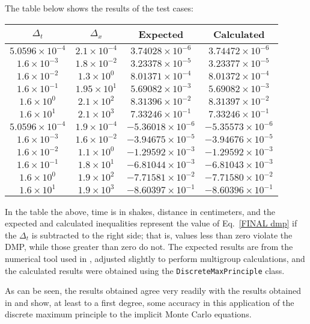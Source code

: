 \newpage
The table below shows the results of the test cases:
\begin{center}
\begin{tabular}{c c c c}
$\Delta_t$ & $\Delta_x$ & Expected & Calculated \\ \hline
$5.0596\times10^{-4}$ & $2.1\times10^{-4}$ & $3.74028\times10^{-6}$ &
  $3.74472\times10^{-6}$ \\
$1.6\times10^{-3}$ & $1.8\times10^{-2}$ & $3.23378\times10^{-5}$ &
  $3.23377\times10^{-5}$ \\
$1.6\times10^{-2}$ & $1.3\times10^{0}$ & $8.01371\times10^{-4}$ &
  $8.01372\times10^{-4}$ \\
$1.6\times10^{-1}$ & $1.95\times10^{1}$ & $5.69082\times10^{-3}$ &
  $5.69082\times10^{-3}$ \\
$1.6\times10^{0}$ & $2.1\times10^{2}$ & $8.31396\times10^{-2}$ &
  $8.31397\times10^{-2}$ \\
$1.6\times10^{1}$ & $2.1\times10^{3}$ & $7.33246\times10^{-1}$ &
  $7.33246\times10^{-1}$ \\ \hline
$5.0596\times10^{-4}$ & $1.9\times10^{-4}$ & $-5.36018\times10^{-6}$ &
  $-5.35573\times10^{-6}$ \\
$1.6\times10^{-3}$ & $1.6\times10^{-2}$ & $-3.94675\times10^{-5}$ &
  $-3.94676\times10^{-5}$ \\
$1.6\times10^{-2}$ & $1.1\times10^{0}$ & $-1.29592\times10^{-3}$ &
  $-1.29592\times10^{-3}$ \\
$1.6\times10^{-1}$ & $1.8\times10^{1}$ & $-6.81044\times10^{-3}$ &
  $-6.81043\times10^{-3}$ \\
$1.6\times10^{0}$ & $1.9\times10^{2}$ & $-7.71581\times10^{-2}$ &
  $-7.71580\times10^{-2}$ \\
$1.6\times10^{1}$ & $1.9\times10^{3}$ & $-8.60397\times10^{-1}$ &
  $-8.60396\times10^{-1}$ 
\end{tabular}
\end{center}
In the table the above, time is in shakes, distance in centimeters, and the
expected and calculated inequalities represent the value of Eq.\ \eqref{FINAL
dmp} if the $\Delta_t$ is subtracted to the right side; that is, values less
than zero violate the DMP, while those greater than zero do not.  The expected
results are from the numerical tool used in \cite{WolLarDen}, adjusted
slightly to perform multigroup calculations, and the calculated results were
obtained using the \texttt{DiscreteMaxPrinciple} class.

As can be seen, the results obtained agree very readily with the results
obtained in \cite{WolLarDen} and show, at least to a first degree, some
accuracy in this application of the discrete maximum principle to the
implicit Monte Carlo equations.